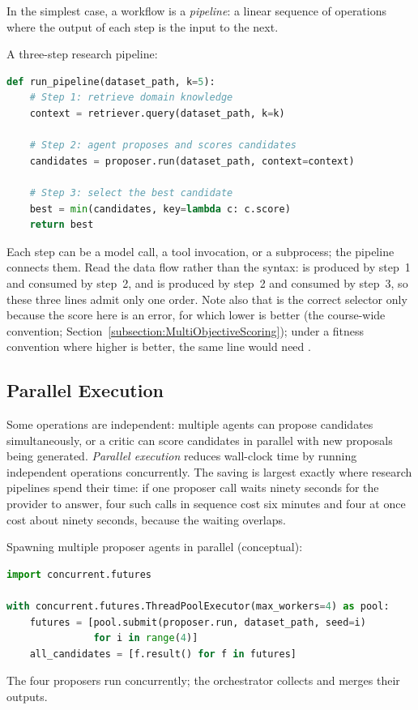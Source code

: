 In the simplest case, a workflow is a \emph{pipeline}: a linear sequence of operations where the output of each step is the input to the next.

\begin{example}
A three-step research pipeline:
\begin{lstlisting}[language=python]
def run_pipeline(dataset_path, k=5):
    # Step 1: retrieve domain knowledge
    context = retriever.query(dataset_path, k=k)

    # Step 2: agent proposes and scores candidates
    candidates = proposer.run(dataset_path, context=context)

    # Step 3: select the best candidate
    best = min(candidates, key=lambda c: c.score)
    return best
\end{lstlisting}
Each step can be a model call, a tool invocation, or a subprocess; the pipeline connects them.
Read the data flow rather than the syntax:  is produced by step~1 and consumed by step~2, and  is produced by step~2 and consumed by step~3, so these three lines admit only one order.
Note also that  is the correct selector only because the score here is an error, for which lower is better (the course-wide convention; Section~\ref{subsection:MultiObjectiveScoring}); under a fitness convention where higher is better, the same line would need .
\end{example}

\subsection{Parallel Execution}

Some operations are independent: multiple agents can propose candidates simultaneously, or a critic can score candidates in parallel with new proposals being generated.
\emph{Parallel execution} reduces wall-clock time by running independent operations concurrently.
The saving is largest exactly where research pipelines spend their time: if one proposer call waits ninety seconds for the provider to answer, four such calls in sequence cost six minutes and four at once cost about ninety seconds, because the waiting overlaps.

\begin{example}
Spawning multiple proposer agents in parallel (conceptual):
\begin{lstlisting}[language=python]
import concurrent.futures

with concurrent.futures.ThreadPoolExecutor(max_workers=4) as pool:
    futures = [pool.submit(proposer.run, dataset_path, seed=i)
               for i in range(4)]
    all_candidates = [f.result() for f in futures]
\end{lstlisting}
The four proposers run concurrently; the orchestrator collects and merges their outputs.
\end{example}

